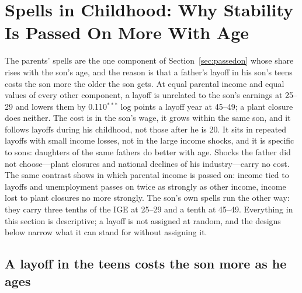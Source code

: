 \section{Spells in Childhood: Why Stability Is Passed On More With Age}\label{sec:stability}

The parents' spells are the one component of Section~\ref{sec:passedon} whose share rises with the son's age, and the
reason is that a father's layoff in his son's teens costs the son more the older the son gets. At equal parental income
and equal values of every other component, a layoff is unrelated to the son's earnings at 25--29 and lowers them by
0.110$^{***}$ log points a layoff year at 45--49; a plant closure does neither. The cost is in the son's wage, it grows
within the same son, and it follows layoffs during his childhood, not those after he is 20. It sits in repeated layoffs
with small income losses, not in the large income shocks, and it is specific to sons: daughters of the same fathers do
better with age. Shocks the father did not choose---plant closures and national declines of his industry---carry no
cost. The same contrast shows in which parental income is passed on: income tied to layoffs and unemployment passes on
twice as strongly as other income, income lost to plant closures no more strongly. The son's own spells run the other
way: they carry three tenths of the IGE at 25--29 and a tenth at 45--49. Everything in this section is descriptive; a
layoff is not assigned at random, and the designs below narrow what it can stand for without assigning it.

\subsection{A layoff in the teens costs the son more as he ages}

